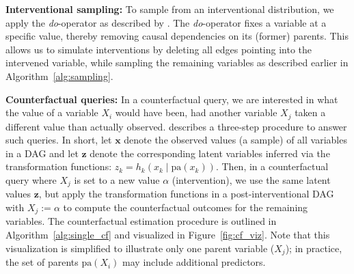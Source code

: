 
\textbf{Interventional sampling:} To sample from an interventional distribution, we apply the \textit{do}-operator as described by \citet{pearl1995}. The \textit{do}-operator fixes a variable at a specific value, thereby removing causal dependencies on its (former) parents. This allows us to simulate interventions by deleting all edges pointing into the intervened variable, while sampling the remaining variables as described earlier in Algorithm~\ref{alg:sampling}. 

% 

\medskip

\textbf{Counterfactual queries:} In a counterfactual query, we are interested in what the value of a variable $X_i$ would have been, had another variable $X_j$ taken a different value than actually observed. \citet{pearl_book2009} describes a three-step procedure to answer such queries. In short, let $\mathbf{x}$ denote the observed values (a sample) of all variables in a DAG and let $\mathbf{z}$ denote the corresponding latent variables inferred via the transformation functions: $z_k = h_k(x_k \mid \text{pa}(x_k))$. Then, in a counterfactual query where $X_j$ is set to a new value $\alpha$ (intervention), we use the same latent values $\mathbf{z}$, but apply the transformation functions in a post-interventional DAG with $X_j := \alpha$ to compute the counterfactual outcomes for the remaining variables.
The counterfactual estimation procedure is outlined in Algorithm~\ref{alg:single_cf} and visualized in Figure~\ref{fig:cf_viz}. Note that this visualization is simplified to illustrate only one parent variable ($X_j$); in practice, the set of parents $\text{pa}(X_i)$ may include additional predictors.

